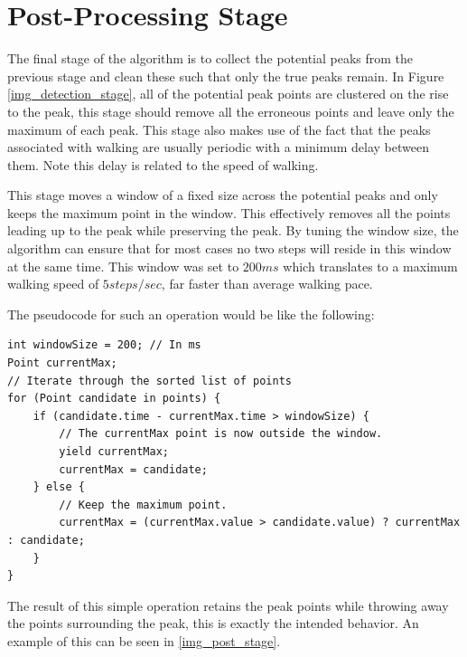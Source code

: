         \section{Post-Processing Stage}

            The final stage of the algorithm is to collect the potential peaks from the previous stage and clean these such that only the true peaks remain. In Figure \ref{img_detection_stage}, all of the potential peak points are clustered on the rise to the peak, this stage should remove all the erroneous points and leave only the maximum of each peak. This stage also makes use of the fact that the peaks associated with walking are usually periodic with a minimum delay between them. Note this delay is related to the speed of walking.

            This stage moves a window of a fixed size across the potential peaks and only keeps the maximum point in the window. This effectively removes all the points leading up to the peak while preserving the peak. By tuning the window size, the algorithm can ensure that for most cases no two steps will reside in this window at the same time. This window was set to $200ms$ which translates to a maximum walking speed of $5 steps/sec$, far faster than average walking pace.

            The pseudocode for such an operation would be like the following:

            \begin{lstlisting}
int windowSize = 200; // In ms
Point currentMax;
// Iterate through the sorted list of points
for (Point candidate in points) {
    if (candidate.time - currentMax.time > windowSize) {
        // The currentMax point is now outside the window. 
        yield currentMax;
        currentMax = candidate;
    } else {
        // Keep the maximum point.
        currentMax = (currentMax.value > candidate.value) ? currentMax : candidate;
    }
}
            \end{lstlisting}

            The result of this simple operation retains the peak points while throwing away the points surrounding the peak, this is exactly the intended behavior. An example of this can be seen in \ref{img_post_stage}.

